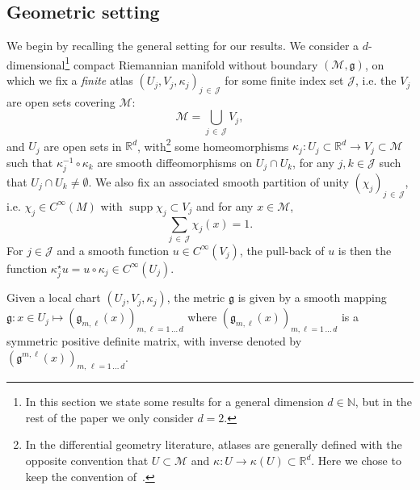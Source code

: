 \documentclass[AHL,Unicode,longabstracts,published]{cedram}
\newcommand{\R}{\mathbb{R}}
\newcommand{\N}{\mathbb{N}}
\DeclareMathOperator*{\supp}{supp}
\newcommand{\J}{\mathcal{J}}
\newcommand{\M}{\mathcal{M}}
\newcommand{\g}{\mathfrak{g}}
\newcommand{\kk}{\kappa}
\begin{document}
\subsection{Geometric setting} 
We begin by recalling the general setting for our results. We consider a $d$-dimensio\-nal\footnote{ In this section we state some results for a general dimension $d\in\N$, but in the rest of the paper we only consider $d=2$.} compact Riemannian manifold without boundary $(\M,\g)$, on which we fix a \emph{finite} atlas $(U_j,V_j,\kk_j)_{j\,\in\,\J}$ for some finite index set $\J$, i.e. the $V_j$ are open sets covering $\M$:
\begin{equation*}
\M=\bigcup_{j\,\in\,\J}V_j,
\end{equation*}
and $U_j$ are open sets in $\R^d$, with\footnote{In the differential geometry literature, atlases are generally defined with the opposite convention that $U\subset \M$ and $\kk: U\rightarrow \kk(U)\subset \R^d$. Here we chose to keep the convention of~\cite{BGT}.} some homeomorphisms $\kk_j: U_j\subset \R^d\rightarrow V_j\subset\M$ such that $\kk_j^{-1}\circ \kk_k$ are smooth diffeomorphisms on $U_j\cap U_k$, for any $j,k\in\J$ such that $U_j\cap U_k\neq\emptyset$. We also fix an associated smooth partition of unity $(\chi_j)_{j\,\in\,\J}$, i.e. $\chi_j\in C^{\infty}(M)$ with $\supp\chi_j\subset V_j$ and for any $x\in\M$,
\begin{equation*}
\sum_{j\,\in\,\J}\chi_j(x) = 1.
\end{equation*}
For $j\in \J$ and a smooth function $u\in C^{\infty}(V_j)$, the pull-back of $u$ is then the function $\kk_j^{\star}u = u\circ \kk_j \in C^{\infty}(U_j)$.

Given a local chart $(U_j,V_j,\kk_j)$, the metric $\g$ is given by a smooth mapping $\g: x\in U_j\mapsto (\g_{m,\ell}(x))_{m,\ell=1\,\dots\,d}$ where $(\g_{m,\ell}(x))_{m,\ell=1\,\dots\, d}$ is a symmetric positive definite matrix, with inverse denoted by $(\g^{m,\ell}(x))_{m,\,\ell=1\,\dots\,d}$.
\end{document}
